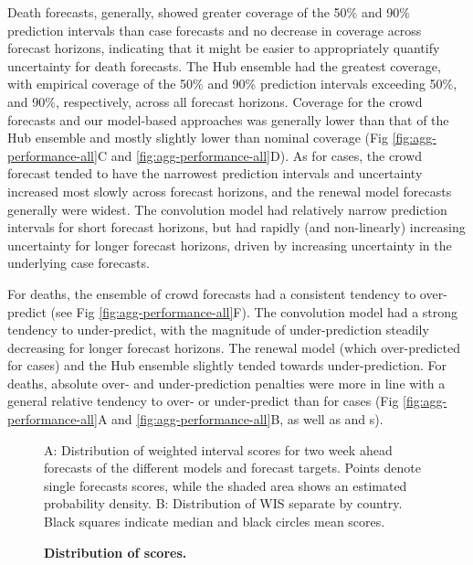 \documentclass[10pt,letterpaper]{article}
\begin{document}
Death forecasts, generally, showed greater coverage of the 50\% and 90\%
prediction intervals than case forecasts and no decrease in coverage
across forecast horizons, indicating that it might be easier to
appropriately quantify uncertainty for death forecasts. The Hub ensemble
had the greatest coverage, with empirical coverage of the 50\% and 90\%
prediction intervals exceeding 50\%, and 90\%, respectively, across all
forecast horizons. Coverage for the crowd forecasts and our model-based
approaches was generally lower than that of the Hub ensemble and mostly
slightly lower than nominal coverage (Fig \ref{fig:agg-performance-all}C
and \ref{fig:agg-performance-all}D). As for cases, the crowd forecast
tended to have the narrowest prediction intervals and uncertainty
increased most slowly across forecast horizons, and the renewal model
forecasts generally were widest. The convolution model had relatively
narrow prediction intervals for short forecast horizons, but had rapidly
(and non-linearly) increasing uncertainty for longer forecast horizons,
driven by increasing uncertainty in the underlying case forecasts.

For deaths, the ensemble of crowd forecasts had a consistent tendency to
over-predict (see Fig \ref{fig:agg-performance-all}F). The convolution
model had a strong tendency to under-predict, with the magnitude of
under-prediction steadily decreasing for longer forecast horizons. The
renewal model (which over-predicted for cases) and the Hub ensemble
slightly tended towards under-prediction. For deaths, absolute over- and
under-prediction penalties were more in line with a general relative
tendency to over- or under-predict than for cases (Fig
\ref{fig:agg-performance-all}A and \ref{fig:agg-performance-all}B, as
well as  and s).

\begin{figure}[H]
\caption{\bf{Distribution of scores. }}
A: Distribution of weighted interval scores for two week ahead forecasts of the different models and forecast targets. Points denote single forecasts scores, while the shaded area shows an estimated probability density. B: Distribution of WIS separate by country. Black squares indicate median and black circles mean scores.
\label{fig:distribution-scores}
\end{figure}
\end{document}

